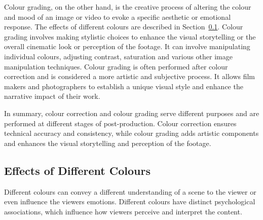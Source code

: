 \documentclass[../MasterThesis.tex]{subfiles}
\begin{document}
Colour grading, on the other hand, is the creative process of altering the colour and mood of an image or video to evoke a specific aesthetic or emotional response. The effects of different colours are described in Section~\ref{subsection:effectsofdifferentcolours}.
Colour grading involves making stylistic choices to enhance the visual storytelling or the overall cinematic look or perception of the footage. It can involve manipulating individual colours, adjusting contrast, saturation and various other image manipulation techniques. Colour grading is often performed after colour correction and is considered a more artistic and subjective process. It allows film makers and photographers to establish a unique visual style and enhance the narrative impact of their work.~\cite{cc_cg_1, cc_cg_2}


In summary, colour correction and colour grading serve different purposes and are performed at different stages of post-production. Colour correction ensures technical accuracy and consistency, while colour grading adds artistic components and enhances the visual storytelling and perception of the footage.~\cite{cc1, cc_cg_1, cc_cg_2}


















\newpage
\subsection{Effects of Different Colours} 
\label{subsection:effectsofdifferentcolours}

Different colours can convey a different understanding of a scene to the viewer or even influence the viewers emotions. 
Different colours have distinct psychological associations, which influence how viewers perceive and interpret the content.~\cite{colour,colour2}
\end{document}
